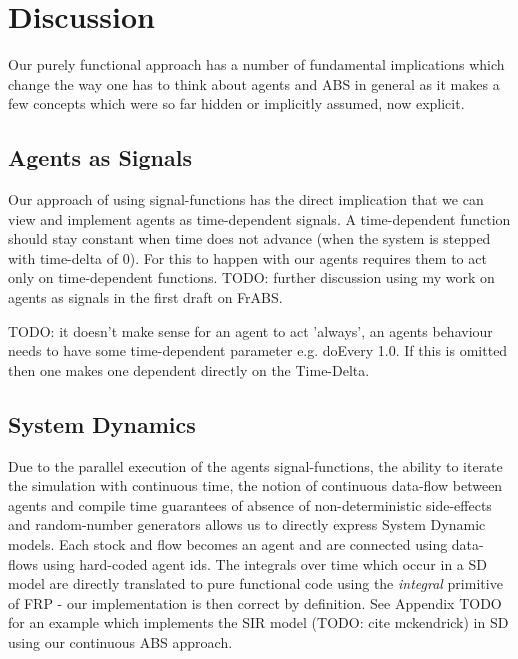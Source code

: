\section{Discussion}
Our purely functional approach has a number of fundamental implications which change the way one has to think about agents and ABS in general as it makes a few concepts which were so far hidden or implicitly assumed, now explicit. 

\subsection{Agents as Signals}
Our approach of using signal-functions has the direct implication that we can view and implement agents as time-dependent signals. A time-dependent function should stay constant when time does not advance (when the system is stepped with time-delta of 0). For this to happen with our agents requires them to act only on time-dependent functions. TODO: further discussion using my work on agents as signals in the first draft on FrABS.

TODO: it doesn't make sense for an agent to act 'always', an agents behaviour needs to have some time-dependent parameter e.g. doEvery 1.0. If this is omitted then one makes one dependent directly on the Time-Delta.

\subsection{System Dynamics}
Due to the parallel execution of the agents signal-functions, the ability to iterate the simulation with continuous time, the notion of continuous data-flow between agents and compile time guarantees of absence of non-deterministic side-effects and random-number generators allows us to directly express System Dynamic models.
Each stock and flow becomes an agent and are connected using data-flows using hard-coded agent ids. The integrals over time which occur in a SD model are directly translated to pure functional code using the \textit{integral} primitive of FRP - our implementation is then correct by definition.
See Appendix TODO for an example which implements the SIR model (TODO: cite mckendrick) in SD using our continuous ABS approach.